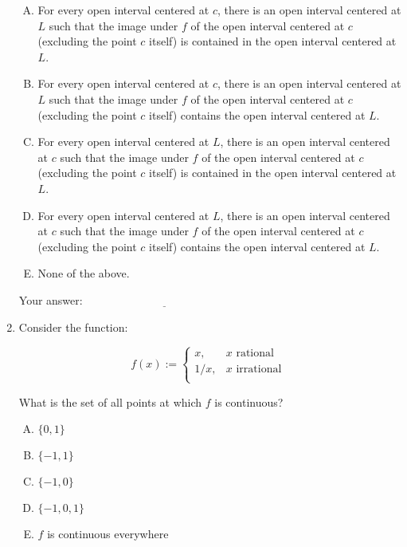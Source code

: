\documentclass[10pt]{amsart}
\begin{document}
\begin{enumerate}
  \begin{enumerate}[(A)]
  \item For every open interval centered at $c$, there is an open
    interval centered at $L$ such that the image under $f$ of the open
    interval centered at $c$ (excluding the point $c$ itself) is
    contained in the open interval centered at $L$.
  \item For every open interval centered at $c$, there is an open
    interval centered at $L$ such that the image under $f$ of the open
    interval centered at $c$ (excluding the point $c$ itself) contains
    the open interval centered at $L$.
  \item For every open interval centered at $L$, there is an open
    interval centered at $c$ such that the image under $f$ of the open
    interval centered at $c$ (excluding the point $c$ itself) is
    contained in the open interval centered at $L$.
  \item For every open interval centered at $L$, there is an open
    interval centered at $c$ such that the image under $f$ of the open
    interval centered at $c$ (excluding the point $c$ itself) contains
    the open interval centered at $L$.
  \item None of the above.
  \end{enumerate}

  \vspace{0.1in}
  Your answer: $\underline{\qquad\qquad\qquad\qquad\qquad\qquad\qquad}$
  \vspace{0.5in}

\item Consider the function:

  $$f(x) := \left \lbrace\begin{array}{rl} x, & x \text{ rational }\\1/x, & x \text{ irrational }\\\end{array}\right.$$

  What is the set of all points at which $f$ is continuous? 

  \begin{enumerate}[(A)]
  \item $\{ 0, 1 \}$
  \item $\{ -1,1 \}$
  \item $\{-1,0 \}$
  \item $\{ -1,0,1 \}$
  \item $f$ is continuous everywhere
  \end{enumerate}


\end{enumerate}
\end{document}
